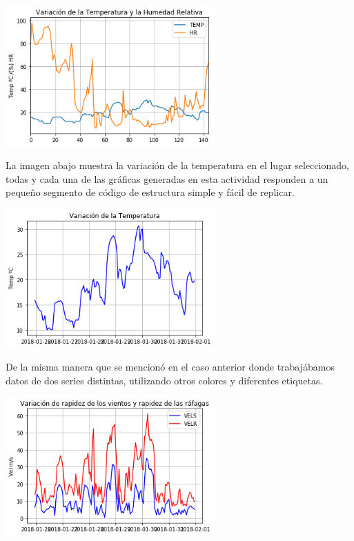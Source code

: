 \documentclass{article} %
\begin{document}
 \begin{center}
 	\includegraphics[width=8cm]{2.png}
 \end{center}

La imagen abajo muestra la variación de la temperatura en el lugar seleccionado, todas y cada una de las gráficas generadas en esta actividad responden  a un pequeño segmento de código de estructura simple y fácil de replicar.

 \begin{center}
 	\includegraphics[width=8cm]{3.png}
 \end{center}

De la misma manera que se mencionó en el caso anterior donde trabajábamos datos de dos series distintas, utilizando otros colores y diferentes etiquetas. 

 \begin{center}
 	\includegraphics[width=8cm]{4.png}
 \end{center}
\end{document}
